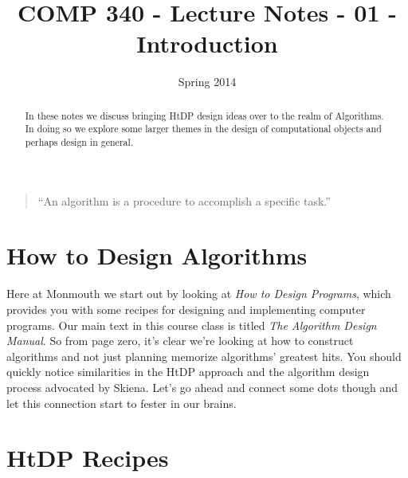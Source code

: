 \documentclass[]{tufte-handout}
\title{COMP 340 - Lecture Notes - 01 - Introduction }
\date{Spring 2014}
\begin{document}
\maketitle

\begin{abstract}
In these notes we discuss bringing HtDP design ideas over to the realm of Algorithms. In doing so we explore some larger themes in the design of computational objects and perhaps design in general.  
\end{abstract}

\begin{quote}
``An algorithm is a procedure to accomplish a specific task.''
\end{quote}

\section{How to Design Algorithms}

Here at Monmouth we start out by looking at \textit{How to Design Programs}, which provides you with some recipes  for designing and implementing computer programs.  Our main text in this course class is titled \textit{The Algorithm Design Manual}.  So from page zero, it's clear we're looking at how to construct algorithms and not just planning memorize algorithms' greatest hits.  You should quickly notice similarities in the HtDP approach and the algorithm design process advocated by Skiena. Let's go ahead and connect some dots though and let this connection start to fester in our brains.  

\section{HtDP Recipes}
\end{document}
